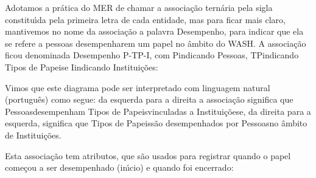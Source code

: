 \documentclass[
12pt,		%
openright,	%
twoside,  %
a4paper,			%
chapter=TITLE,		%
english,			%
french,				%
spanish,			%
brazil				%
]{USPSC-classe/USPSC}
\begin{document}
Adotamos a pr\'atica do MER de chamar a associa\c{c}\~ao tern\'aria pela sigla constitu\'{\i}da pela primeira letra de cada entidade, mas para ficar mais claro, mantivemos no nome da associa\c{c}\~ao a palavra \textquotedbl Desempenho\textquotedbl , para indicar que ela se refere a \textquotedbl pessoas desempenharem um papel no \^ambito do WASH\textquotedbl . A associa\c{c}\~ao ficou denominada \textquotedbl Desempenho P-TP-I\textquotedbl , com \textquotedbl P\textquotedbl  indicando \textquotedbl Pessoas\textquotedbl , \textquotedbl TP\textquotedbl  indicando \textquotedbl Tipos de Papeis\textquotedbl  e \textquotedbl I\textquotedbl  indicando Institui\c{c}\~oes:
















Vimos que este diagrama pode ser interpretado com linguagem natural (portugu\^es) como segue: da esquerda para a direita a associa\c{c}\~ao significa que \textquotedbl Pessoas\textquotedbl  desempenham \textquotedbl Tipos de Papeis\textquotedbl   vinculadas a \textquotedbl Institui\c{c}\~oes\textquotedbl  e, da direita para a esquerda, significa que \textquotedbl Tipos de Papeis\textquotedbl  s\~ao desempenhados por \textquotedbl Pessoas\textquotedbl  no \^ambito de \textquotedbl Institui\c{c}\~oes\textquotedbl .














Esta associa\c{c}\~ao tem atributos, que s\~ao usados para registrar quando o papel come\c{c}ou a ser desempenhado (in\'{\i}cio) e quando foi encerrado:
\end{document}
